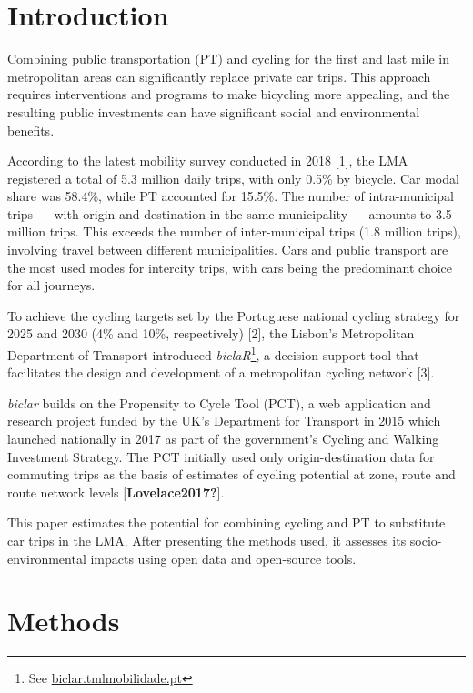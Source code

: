 \documentclass[runningheads]{llncs}
\begin{document}
\hypertarget{introduction}{%
\section{Introduction}\label{introduction}}

Combining public transportation (PT) and cycling for the first and last
mile in metropolitan areas can significantly replace private car trips.
This approach requires interventions and programs to make bicycling more
appealing, and the resulting public investments can have significant
social and environmental benefits.

According to the latest mobility survey conducted in 2018 {[}1{]}, the
LMA registered a total of 5.3 million daily trips, with only 0.5\% by
bicycle. Car modal share was 58.4\%, while PT accounted for 15.5\%. The
number of intra-municipal trips --- with origin and destination in the
same municipality --- amounts to 3.5 million trips. This exceeds the
number of inter-municipal trips (1.8 million trips), involving travel
between different municipalities. Cars and public transport are the most
used modes for intercity trips, with cars being the predominant choice
for all journeys.

To achieve the cycling targets set by the Portuguese national cycling
strategy for 2025 and 2030 (4\% and 10\%, respectively) {[}2{]}, the
Lisbon's Metropolitan Department of Transport introduced
\emph{biclaR}\footnote{See
  \href{https://biclar.tmlmobilidade.pt/}{biclar.tmlmobilidade.pt}}, a
decision support tool that facilitates the design and development of a
metropolitan cycling network {[}3{]}.

\emph{biclar} builds on the Propensity to Cycle Tool (PCT), a web
application and research project funded by the UK's Department for
Transport in 2015 which launched nationally in 2017 as part of the
government's Cycling and Walking Investment Strategy. The PCT initially
used only origin-destination data for commuting trips as the basis of
estimates of cycling potential at zone, route and route network levels
{[}\textbf{Lovelace2017?}{]}.

This paper estimates the potential for combining cycling and PT to
substitute car trips in the LMA. After presenting the methods used, it
assesses its socio-environmental impacts using open data and open-source
tools.

\hypertarget{methods}{%
\section{Methods}\label{methods}}
\end{document}
